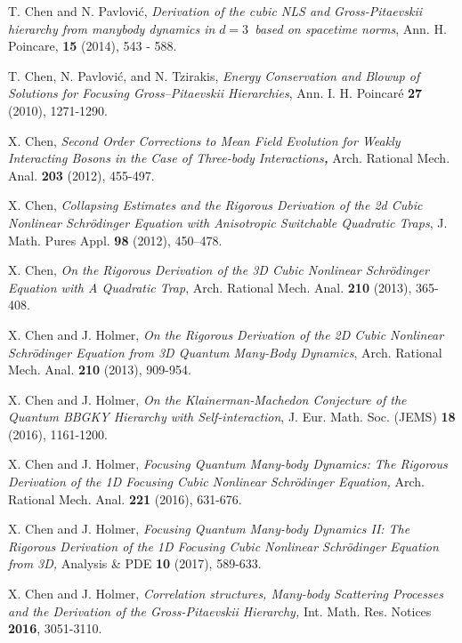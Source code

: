 \documentclass[12pt,letterpaper,leqno]{amsart}
\theoremstyle{plain}
\numberwithin{equation}{section}
\numberwithin{theorem}{section}
\numberwithin{proposition}{section}
\numberwithin{lemma}{section}
\numberwithin{corollary}{section}
\begin{document}
\begin{thebibliography}{99}
 T. Chen and N. Pavlovi\'{c}, \emph{Derivation
of the cubic NLS and Gross-Pitaevskii hierarchy from manybody dynamics in }$%
d=3$\emph{\ based on spacetime norms}, Ann. H. Poincare, \textbf{15} (2014),
543 - 588.

 T. Chen, N. Pavlovi\'{c}, and N. Tzirakis, \emph{Energy
Conservation and Blowup of Solutions for Focusing Gross--Pitaevskii
Hierarchies}, Ann. I. H. Poincar\'{e} \textbf{27} (2010), 1271-1290.

 X. Chen, \emph{Second Order Corrections to Mean Field
Evolution for Weakly Interacting Bosons in the Case of Three-body
Interactions\textbf{,} }Arch. Rational Mech. Anal. \textbf{203} (2012),
455-497.

 X. Chen, \emph{Collapsing Estimates and the
Rigorous Derivation of the 2d Cubic Nonlinear Schr\"{o}dinger Equation with
Anisotropic Switchable Quadratic Traps}, J. Math. Pures Appl. \textbf{98}
(2012), 450--478.

 X. Chen, \emph{On the Rigorous Derivation of the
3D Cubic Nonlinear Schr\"{o}dinger Equation with A Quadratic Trap}, Arch.
Rational Mech. Anal. \textbf{210 }(2013), 365-408.

 X. Chen and J. Holmer, \emph{On the Rigorous Derivation
of the 2D Cubic Nonlinear Schr\"{o}dinger Equation from 3D Quantum Many-Body
Dynamics}, Arch. Rational Mech. Anal. \textbf{210 }(2013), 909-954.

 X. Chen and J. Holmer, \emph{On the Klainerman-Machedon
Conjecture of the Quantum BBGKY Hierarchy with Self-interaction}, J. Eur.
Math. Soc. (JEMS) \textbf{18} (2016), 1161-1200.

 X. Chen and J. Holmer, \emph{Focusing Quantum
Many-body Dynamics: The Rigorous Derivation of the 1D Focusing Cubic
Nonlinear Schr\"{o}dinger Equation,} Arch. Rational Mech. Anal. \textbf{221}
(2016), 631-676.

 X. Chen and J. Holmer, \emph{Focusing Quantum
Many-body Dynamics II: The Rigorous Derivation of the 1D Focusing Cubic
Nonlinear Schr\"{o}dinger Equation from 3D,} Analysis \& PDE \textbf{10}
(2017), 589-633.

 X. Chen and J. Holmer, \emph{Correlation structures,
Many-body Scattering Processes and the Derivation of the Gross-Pitaevskii
Hierarchy,} Int. Math. Res. Notices \textbf{2016}, 3051-3110.


\end{thebibliography}
\end{document}
